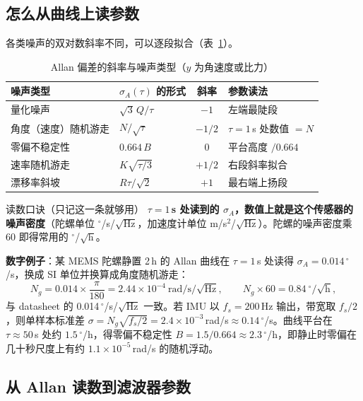 \subsection{怎么从曲线上读参数}

各类噪声的双对数斜率不同，可以逐段拟合（表~\ref{tab:26-allan}）。

\begin{table}[htbp]
  \centering
  \caption{Allan 偏差的斜率与噪声类型（$y$ 为角速度或比力）}\label{tab:26-allan}
  \small
  \begin{tabular}{llcl}
    \toprule
    噪声类型 & $\sigma_A(\tau)$ 的形式 & 斜率 & 参数读法 \\
    \midrule
    量化噪声 & $\sqrt{3}\,Q/\tau$ & $-1$ & 左端最陡段 \\
    角度（速度）随机游走 & $N/\sqrt{\tau}$ & $-1/2$ & $\tau=1$\,s 处数值 $=N$ \\
    零偏不稳定性 & $0.664\,B$ & $0$ & 平台高度 $/0.664$ \\
    速率随机游走 & $K\sqrt{\tau/3}$ & $+1/2$ & 右段斜率拟合 \\
    漂移率斜坡 & $R\tau/\sqrt{2}$ & $+1$ & 最右端上扬段 \\
    \bottomrule
  \end{tabular}
\end{table}

\begin{keybox}{读数口诀（只记这一条就够用）}
\textbf{$\tau=1$\,s 处读到的 $\sigma_A$，数值上就是这个传感器的噪声密度}（陀螺单位 $^{\circ}$/s/$\sqrt{\mathrm{Hz}}$，加速度计单位 m/s$^2$/$\sqrt{\mathrm{Hz}}$）。陀螺的噪声密度乘 60 即得常用的 $^{\circ}$/$\sqrt{\mathrm{h}}$。
\end{keybox}

\textbf{数字例子}：某 MEMS 陀螺静置 2\,h 的 Allan 曲线在 $\tau=1$\,s 处读得 $\sigma_A=0.014\,^{\circ}$/s，换成 SI 单位并换算成角度随机游走：
\begin{equation}
N_g=0.014\times\frac{\pi}{180}=2.44\times10^{-4}\ \mathrm{rad/s/\sqrt{Hz}},
\qquad N_g\times60=0.84\ ^{\circ}\mathrm{/\sqrt{h}},
\end{equation}
与 datasheet 的 0.014\,$^{\circ}$/s/$\sqrt{\mathrm{Hz}}$ 一致。若 IMU 以 $f_s=200$\,Hz 输出，带宽取 $f_s/2$，则单样本标准差 $\sigma=N_g\sqrt{f_s/2}=2.4\times10^{-3}$\,rad/s$\approx0.14\,^{\circ}$/s。曲线平台在 $\tau\approx50$\,s 处约 $1.5\,^{\circ}$/h，得零偏不稳定性 $B=1.5/0.664\approx2.3\,^{\circ}$/h，即静止时零偏在几十秒尺度上有约 $1.1\times10^{-5}$\,rad/s 的随机浮动。

\subsection{从 Allan 读数到滤波器参数}

